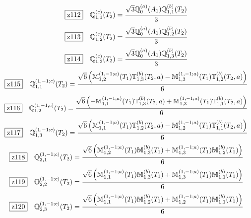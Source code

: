 \documentclass[fleqn,10pt,landscape]{jsarticle}
\begin{document}
\begin{dmath*}
\hspace*{3mm}\fbox{z112}\quad \mathbb{Q}_{1,1}^{(c)}(T_{2})=\frac{\sqrt{3} \mathbb{Q}_{0}^{(a)}(A_{1}) \mathbb{Q}_{1,1}^{(b)}(T_{2})}{3}
\end{dmath*}
\begin{dmath*}
\hspace*{3mm}\fbox{z113}\quad \mathbb{Q}_{1,2}^{(c)}(T_{2})=\frac{\sqrt{3} \mathbb{Q}_{0}^{(a)}(A_{1}) \mathbb{Q}_{1,2}^{(b)}(T_{2})}{3}
\end{dmath*}
\begin{dmath*}
\hspace*{3mm}\fbox{z114}\quad \mathbb{Q}_{1,3}^{(c)}(T_{2})=\frac{\sqrt{3} \mathbb{Q}_{0}^{(a)}(A_{1}) \mathbb{Q}_{1,3}^{(b)}(T_{2})}{3}
\end{dmath*}
\begin{dmath*}
\hspace*{3mm}\fbox{z115}\quad \mathbb{Q}_{1,1}^{(1,-1;c)}(T_{2})=\frac{\sqrt{6} \left(\mathbb{M}_{1,2}^{(1,-1;a)}(T_{1}) \mathbb{T}_{1,3}^{(b)}(T_{2},a) - \mathbb{M}_{1,3}^{(1,-1;a)}(T_{1}) \mathbb{T}_{1,2}^{(b)}(T_{2},a)\right)}{6}
\end{dmath*}
\begin{dmath*}
\hspace*{3mm}\fbox{z116}\quad \mathbb{Q}_{1,2}^{(1,-1;c)}(T_{2})=\frac{\sqrt{6} \left(- \mathbb{M}_{1,1}^{(1,-1;a)}(T_{1}) \mathbb{T}_{1,3}^{(b)}(T_{2},a) + \mathbb{M}_{1,3}^{(1,-1;a)}(T_{1}) \mathbb{T}_{1,1}^{(b)}(T_{2},a)\right)}{6}
\end{dmath*}
\begin{dmath*}
\hspace*{3mm}\fbox{z117}\quad \mathbb{Q}_{1,3}^{(1,-1;c)}(T_{2})=\frac{\sqrt{6} \left(\mathbb{M}_{1,1}^{(1,-1;a)}(T_{1}) \mathbb{T}_{1,2}^{(b)}(T_{2},a) - \mathbb{M}_{1,2}^{(1,-1;a)}(T_{1}) \mathbb{T}_{1,1}^{(b)}(T_{2},a)\right)}{6}
\end{dmath*}
\begin{dmath*}
\hspace*{3mm}\fbox{z118}\quad \mathbb{Q}_{2,1}^{(1,-1;c)}(T_{2})=\frac{\sqrt{6} \left(\mathbb{M}_{1,2}^{(1,-1;a)}(T_{1}) \mathbb{M}_{1,3}^{(b)}(T_{1}) + \mathbb{M}_{1,3}^{(1,-1;a)}(T_{1}) \mathbb{M}_{1,2}^{(b)}(T_{1})\right)}{6}
\end{dmath*}
\begin{dmath*}
\hspace*{3mm}\fbox{z119}\quad \mathbb{Q}_{2,2}^{(1,-1;c)}(T_{2})=\frac{\sqrt{6} \left(\mathbb{M}_{1,1}^{(1,-1;a)}(T_{1}) \mathbb{M}_{1,3}^{(b)}(T_{1}) + \mathbb{M}_{1,3}^{(1,-1;a)}(T_{1}) \mathbb{M}_{1,1}^{(b)}(T_{1})\right)}{6}
\end{dmath*}
\begin{dmath*}
\hspace*{3mm}\fbox{z120}\quad \mathbb{Q}_{2,3}^{(1,-1;c)}(T_{2})=\frac{\sqrt{6} \left(\mathbb{M}_{1,1}^{(1,-1;a)}(T_{1}) \mathbb{M}_{1,2}^{(b)}(T_{1}) + \mathbb{M}_{1,2}^{(1,-1;a)}(T_{1}) \mathbb{M}_{1,1}^{(b)}(T_{1})\right)}{6}
\end{dmath*}
\vspace{5mm}
\end{document}
